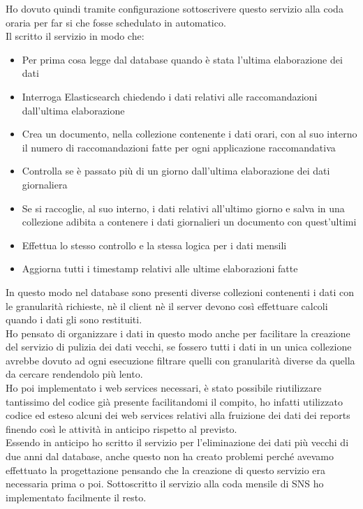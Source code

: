 \documentclass[a4paper, 12pt, twoside, openright]{book}
\begin{document}
Ho dovuto quindi tramite configurazione sottoscrivere questo servizio alla coda oraria per far si che fosse schedulato in automatico.\\
Il scritto il servizio in modo che:
\begin{itemize}
	\item Per prima cosa legge dal database quando è stata l'ultima elaborazione dei dati
	\item Interroga Elasticsearch chiedendo i dati relativi alle raccomandazioni dall'ultima elaborazione 
	\item Crea un documento, nella collezione contenente i dati orari, con al suo interno il numero di raccomandazioni fatte per ogni applicazione raccomandativa
	\item Controlla se è passato più di un giorno dall'ultima elaborazione dei dati giornaliera
	\item Se si raccoglie, al suo interno, i dati relativi all'ultimo giorno e salva in una collezione adibita a contenere i dati giornalieri un documento con quest'ultimi
	\item Effettua lo stesso controllo e la stessa logica per i dati mensili
	\item Aggiorna tutti i timestamp relativi alle ultime elaborazioni fatte
\end{itemize}
In questo modo nel database sono presenti diverse collezioni contenenti i dati con le granularità richieste, nè il client nè il server devono così effettuare calcoli quando i dati gli sono restituiti.\\
Ho pensato di organizzare i dati in questo modo anche per facilitare la creazione del servizio di pulizia dei dati vecchi, se fossero tutti i dati in un unica collezione avrebbe dovuto ad ogni esecuzione filtrare quelli con granularità diverse da quella da cercare rendendolo più lento.\\
Ho poi implementato i web services necessari, è stato possibile riutilizzare tantissimo del codice già presente facilitandomi il compito, ho infatti utilizzato codice ed esteso alcuni dei web services relativi alla fruizione dei dati dei reports finendo così le attività in anticipo rispetto al previsto.\\
Essendo in anticipo ho scritto il servizio per l'eliminazione dei dati più vecchi di due anni dal database, anche questo non ha creato problemi perché avevamo effettuato la progettazione pensando che la creazione di questo servizio era necessaria prima o poi. Sottoscritto il servizio alla coda mensile di SNS ho implementato facilmente il resto.\\
\end{document}
